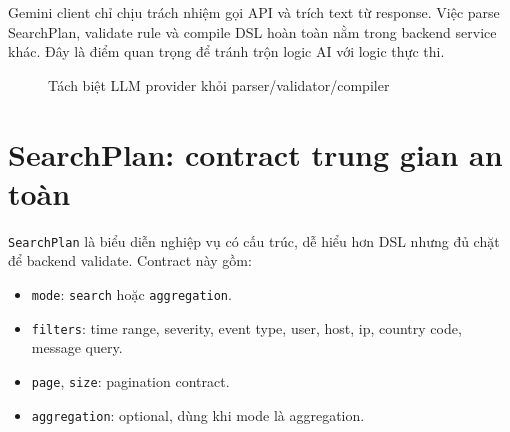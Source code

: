 \documentclass[12pt,a4paper]{report}
\begin{document}
Gemini client chỉ chịu trách nhiệm gọi API và trích text từ response. Việc parse SearchPlan, validate rule và compile DSL hoàn toàn nằm trong backend service khác. Đây là điểm quan trọng để tránh trộn logic AI với logic thực thi.

\begin{figure}[H]
\centering
{}
\caption{Tách biệt LLM provider khỏi parser/validator/compiler}
\label{fig:llm}
\end{figure}

\section{SearchPlan: contract trung gian an toàn}

\texttt{SearchPlan} là biểu diễn nghiệp vụ có cấu trúc, dễ hiểu hơn DSL nhưng đủ chặt để backend validate. Contract này gồm:

\begin{itemize}
    \item \texttt{mode}: \texttt{search} hoặc \texttt{aggregation}.
    \item \texttt{filters}: time range, severity, event type, user, host, ip, country code, message query.
    \item \texttt{page}, \texttt{size}: pagination contract.
    \item \texttt{aggregation}: optional, dùng khi mode là aggregation.
\end{itemize}
\end{document}
